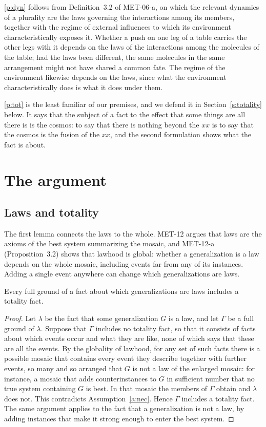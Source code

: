 \documentclass{situationist-preprint}
\begin{document}
\ref{p:dyn} follows from Definition~3.2 of MET-06-a, on which the relevant dynamics of a plurality are the laws governing the interactions among its members, together with the regime of external influences to which its environment characteristically exposes it. Whether a push on one leg of a table carries the other legs with it depends on the laws of the interactions among the molecules of the table; had the laws been different, the same molecules in the same arrangement might not have shared a common fate. The regime of the environment likewise depends on the laws, since what the environment characteristically does is what it does under them.

\ref{p:tot} is the least familiar of our premises, and we defend it in Section~\ref{s:totality} below. It says that the subject of a fact to the effect that some things are all there is is the cosmos: to say that there is nothing beyond the $xx$ is to say that the cosmos is the fusion of the $xx$, and the second formulation shows what the fact is about.

\section{The argument}\label{s:argument}

\subsection{Laws and totality}

The first lemma connects the laws to the whole. MET-12 argues that laws are the axioms of the best system summarizing the mosaic, and MET-12-a (Proposition~3.2) shows that lawhood is global: whether a generalization is a law depends on the whole mosaic, including events far from any of its instances. Adding a single event anywhere can change which generalizations are laws.

\begin{lemma}\label{l:lawtot}
Every full ground of a fact about which generalizations are laws includes a totality fact.
\end{lemma}

\begin{proof}
Let $\lambda$ be the fact that some generalization $G$ is a law, and let $\Gamma$ be a full ground of $\lambda$. Suppose that $\Gamma$ includes no totality fact, so that it consists of facts about which events occur and what they are like, none of which says that these are all the events. By the globality of lawhood, for any set of such facts there is a possible mosaic that contains every event they describe together with further events, so many and so arranged that $G$ is not a law of the enlarged mosaic: for instance, a mosaic that adds counterinstances to $G$ in sufficient number that no true system containing $G$ is best. In that mosaic the members of $\Gamma$ obtain and $\lambda$ does not. This contradicts Assumption~\ref{a:nec}. Hence $\Gamma$ includes a totality fact. The same argument applies to the fact that a generalization is not a law, by adding instances that make it strong enough to enter the best system.
\end{proof}
\end{document}
